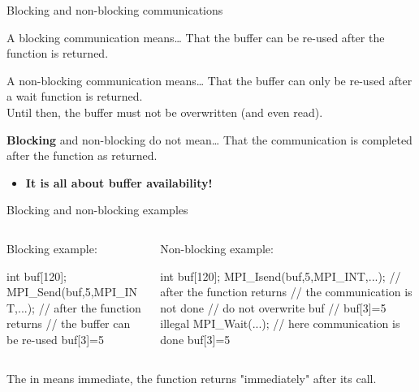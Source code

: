 \documentclass[aspectratio=43]{beamer}
\begin{document}
\begin{frame}{Blocking and non-blocking communications}
\begin{green1block}{A blocking communication means\ldots}
    That the buffer can be re-used after the function is returned.
\end{green1block}
\begin{green1block}{A non-blocking communication means\ldots}
    That the buffer can only be re-used after a wait function is returned.\\
    Until then, the buffer must not be overwritten (and even read).
\end{green1block}
\begin{red1block}{\textbf{Blocking} and non-blocking do not mean\ldots}
    That the communication is completed after the function as returned.
\end{red1block}
\begin{itemize}
    \item<2>[\color{cscsred}$\Rightarrow$]\color{cscsred}\textbf{It is all about buffer availability!}
\end{itemize}
\end{frame}


\begin{frame}[fragile]{Blocking and non-blocking examples}
    \begin{columns}
        \begin{column}{0.45\paperwidth}
            Blocking example:
\begin{Pseudolisting}[]{}
int buf[120];
MPI_Send(buf,5,MPI_INT,...);
// after the function returns
// the buffer can be re-used
buf[3]=5
\end{Pseudolisting}
        \end{column}
        \begin{column}{0.45\paperwidth}
            Non-blocking example:
\begin{Pseudolisting}[]{}
int buf[120];
MPI_Isend(buf,5,MPI_INT,...);
// after the function returns
// the communication is not done
// do not overwrite buf
// buf[3]=5 illegal
MPI_Wait(...);
// here communication is done
buf[3]=5
\end{Pseudolisting}
        \end{column}
    \end{columns}
The  in  means {\color{cscsred}immediate}, the function returns "immediately" after its call.
\end{frame}
\end{document}
